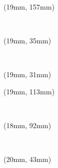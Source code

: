\documentclass[11pt,a4paper,dvipdfmx]{ujarticle}
\begin{document}
\vspace*{19.5mm}
%
\begin{textblock*}{172mm}(19mm, 157mm)\end{textblock*}
~\clearpage
\begin{textblock*}{172mm}(19mm, 35mm)\end{textblock*}
~\clearpage
{}
\begin{textblock*}{172mm}(19mm, 31mm)\end{textblock*}
\vspace*{125mm}
%
\begin{textblock*}{172mm}(19mm, 113mm)\end{textblock*}
~\clearpage
\begin{textblock*}{174mm}(18mm, 92mm)\end{textblock*}
~\clearpage
\begin{textblock*}{170mm}(20mm, 43mm)\end{textblock*}
\end{document}
